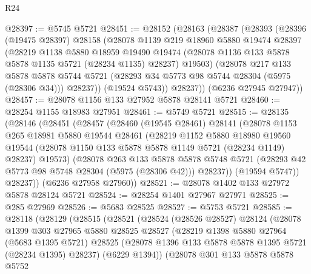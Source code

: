 \begin{lexlean}{R24}
\begin{coremodule}
@28397 := @5745 @5721
@28451 := @28152
    (@28163
      (@28387
        (@28393
          (@28396
            (@19475 @28397)
            @28158
            (@28078
              @1139
              @219
              @18960
              @5880
              @19474
              @28397
              (@28219
                @1138
                @5880
                @18959
                @19490
                @19474
                (@28078 @1136 @133 @5878 @5878 @1135 @5721 (@28234 @1135) @28237)
                @19503)
              (@28078
                @217
                @133
                @5878
                @5878
                @5744
                @5721
                (@28293 @34 @5773 @98 @5744 @28304 (@5975 (@28306 @34)))
                @28237))
            (@19524 @5743))
          @28237))
      (@6236 @27945 @27947))
@28457 := @28078 @1156 @133 @27952 @5878 @28141 @5721
@28460 := @28254 @1155 @18983 @27951
@28461 := @5749 @5721
@28515 := @28135
    (@28146
      (@28451
        (@28457
          (@28460
            (@19545 @28461)
            @28141
            (@28078
              @1153
              @265
              @18981
              @5880
              @19544
              @28461
              (@28219
                @1152
                @5880
                @18980
                @19560
                @19544
                (@28078 @1150 @133 @5878 @5878 @1149 @5721 (@28234 @1149) @28237)
                @19573)
              (@28078
                @263
                @133
                @5878
                @5878
                @5748
                @5721
                (@28293 @42 @5773 @98 @5748 @28304 (@5975 (@28306 @42)))
                @28237))
            (@19594 @5747))
          @28237))
      (@6236 @27958 @27960))
@28521 := @28078 @1402 @133 @27972 @5878 @28124 @5721
@28524 := @28254 @1401 @27967 @27971
@28525 := @285 @27969
@28526 := @5683 @28525
@28527 := @5753 @5721
@28585 := @28118
    (@28129
      (@28515
        (@28521
          (@28524
            (@28526 @28527)
            @28124
            (@28078
              @1399
              @303
              @27965
              @5880
              @28525
              @28527
              (@28219
                @1398
                @5880
                @27964
                (@5683 @1395 @5721)
                @28525
                (@28078 @1396 @133 @5878 @5878 @1395 @5721 (@28234 @1395) @28237)
                (@6229 @1394))
              (@28078
                @301
                @133
                @5878
                @5878
                @5752

\end{coremodule}
\end{lexlean}
